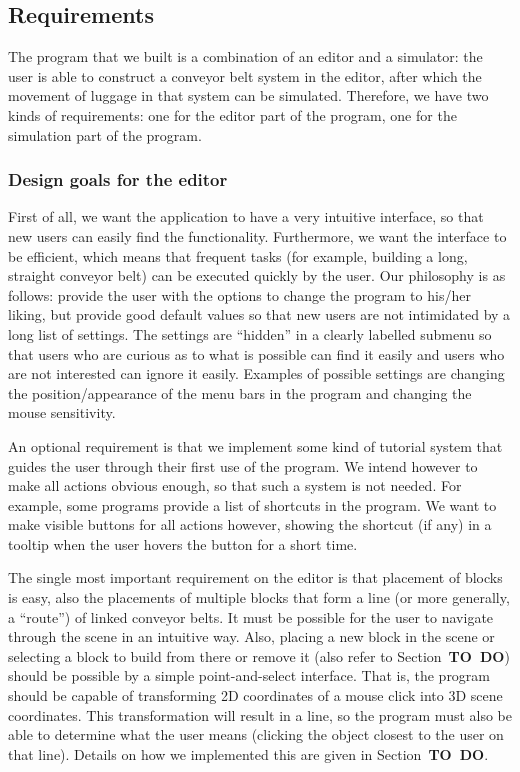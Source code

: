 \subsection{Requirements}
The program that we built is a combination of an editor and a simulator: the user is able to construct a conveyor belt system in the editor, after which the movement of luggage in that system can be simulated. Therefore, we have two kinds of requirements: one for the editor part of the program, one for the simulation part of the program.

\subsubsection{Design goals for the editor}
\label{subsubsec:design-goals-editor}
First of all, we want the application to have a very intuitive interface, so that new users can easily find the functionality. Furthermore, we want the interface to be efficient, which means that frequent tasks (for example, building a long, straight conveyor belt) can be executed quickly by the user. Our philosophy is as follows: provide the user with the options to change the program to his/her liking, but provide good default values so that new users are not intimidated by a long list of settings. The settings are ``hidden'' in a clearly labelled submenu so that users who are curious as to what is possible can find it easily and users who are not interested can ignore it easily. Examples of possible settings are changing the position/appearance of the menu bars in the program and changing the mouse sensitivity.

An optional requirement is that we implement some kind of tutorial system that guides the user through their first use of the program. We intend however to make all actions obvious enough, so that such a system is not needed. For example, some programs provide a list of shortcuts in the program. We want to make visible buttons for all actions however, showing the shortcut (if any) in a tooltip when the user hovers the button for a short time.

The single most important requirement on the editor is that placement of blocks is easy, also the placements of multiple blocks that form a line (or more generally, a ``route'') of linked conveyor belts. It must be possible for the user to navigate through the scene in an intuitive way. Also, placing a new block in the scene or selecting a block to build from there or remove it (also refer to Section~\textbf{TO~DO}) should be possible by a simple point-and-select interface. That is, the program should be capable of transforming 2D coordinates of a mouse click into 3D scene coordinates. This transformation will result in a line, so the program must also be able to determine what the user means (clicking the object closest to the user on that line). Details on how we implemented this are given in Section~\textbf{TO~DO}.

